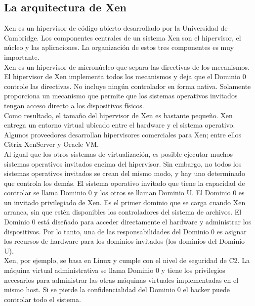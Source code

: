 \subsection{La arquitectura de Xen}
Xen es un hipervisor de código abierto desarrollado por la Universidad de Cambridge\cite{proyectoxen}\cite{proyectoxen2}. Los componentes centrales de un sistema Xen son el hipervisor, el núcleo y las aplicaciones. La organización de estos tres componentes es muy importante.\\

Xen es un hipervisor de micronúcleo que separa las directivas de los mecanismos. El hipervisor de Xen implementa todos los mecanismos y deja que el Dominio 0 controle las directivas. No incluye ningún controlador en forma nativa. Solamente proporciona un mecanismo que permite que los sistemas operativos invitados tengan acceso directo a los dispositivos físicos.\\

Como resultado, el tamaño del hipervisor de Xen es bastante pequeño. Xen entrega un entorno virtual ubicado entre el hardware y el sistema operativo. Algunos proveedores desarrollan hipervisores comerciales para Xen; entre ellos Citrix XenServer y Oracle VM.\\

Al igual que los otros sistemas de virtualización, es posible ejecutar muchos sistemas operativos invitados encima del hipervisor. Sin embargo, no todos los sistemas operativos invitados se crean del mismo modo, y hay uno determinado que controla los demás. El sistema operativo invitado que tiene la capacidad de controlar se llama Dominio 0 y los otros se llaman Dominio U. El Dominio 0 es un invitado privilegiado de Xen. Es el primer dominio que se carga cuando Xen arranca, sin que estén disponibles los controladores del sistema de archivos. El Dominio 0 está diseñado para acceder directamente el hardware y administrar los dispositivos. Por lo tanto, una de las responsabilidades del Dominio 0 es asignar los recursos de hardware para los dominios invitados (los dominios del Dominio U).\\

Xen, por ejemplo, se basa en Linux y cumple con el nivel de seguridad de C2. La máquina virtual administrativa se llama Dominio 0 y tiene los privilegios necesarios para administrar las otras máquinas virtuales implementadas en el mismo host. Si se pierde la confidencialidad del Dominio 0 el hacker puede controlar todo el sistema.\\

